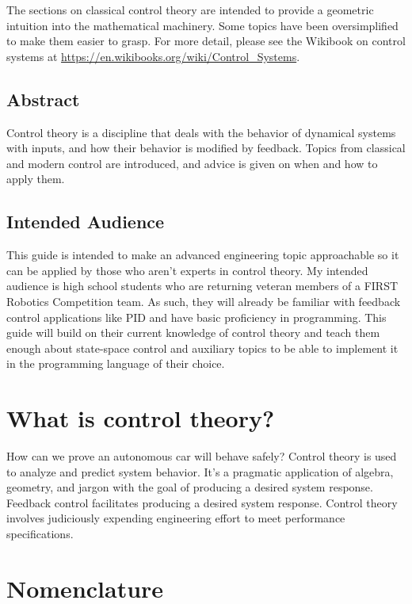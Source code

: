 \documentclass[10pt,conference,compsoc]{IEEEtran}
\begin{document}
\noindent The sections on classical control theory are intended to provide a
geometric intuition into the mathematical machinery. Some topics have been
oversimplified to make them easier to grasp. For more detail, please see the
Wikibook on control systems at
\url{https://en.wikibooks.org/wiki/Control_Systems}.

\subsection{Abstract}

\noindent Control theory is a discipline that deals with the behavior of
dynamical \glspl{system} with inputs, and how their behavior is modified by
feedback. Topics from classical and modern control are introduced, and advice is
given on when and how to apply them.

\subsection{Intended Audience}

\noindent This guide is intended to make an advanced engineering topic
approachable so it can be applied by those who aren't experts in control theory.
My intended audience is high school students who are returning veteran members
of a FIRST Robotics Competition team. As such, they will already be familiar
with feedback control applications like PID and have basic proficiency in
programming. This guide will build on their current knowledge of control theory
and teach them enough about state-space control and auxiliary topics to be able
to implement it in the programming language of their choice.

\section{What is control theory?}

\noindent How can we prove an autonomous car will behave safely? Control theory
is used to analyze and predict \gls{system} behavior. It's a pragmatic
application of algebra, geometry, and jargon with the goal of producing a
desired \gls{system} response. Feedback control facilitates producing a desired
\gls{system} response. Control theory involves judiciously expending engineering
effort to meet performance specifications.

\section{Nomenclature}
\end{document}
